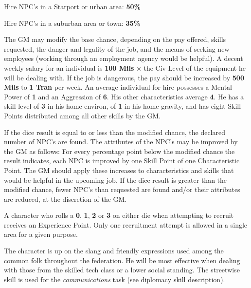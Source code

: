 \begin{tasklist}
\item Hire NPC's in a Starport or urban area: \textbf{50\%}
\item Hire NPC's in a suburban area or town: \textbf{35\%}
\end{tasklist}

The GM may modify the base chance, depending on the pay offered,
skills requested, the danger and legality of the job, and the means of
seeking new employees (working through an employment agency would be
helpful).  A decent weekly salary for an individual is \textbf{100
  Mils} $\times$ the Civ Level of the equipment he will be dealing with.  If
the job is dangerous, the pay should be increased by \textbf{500 Mils}
to \textbf{1 Tran} per week.  An average individual for hire possesses
a Mental Power of \textbf{1} and an Aggression of \textbf{6}.  His
other characteristics average \textbf{4}.  He has a skill level of
\textbf{3} in his home environ, of \textbf{1} in his home gravity, and
has eight Skill Points distributed among all other skills by the GM.

If the dice result is equal to or less than the modified chance, the
declared number of NPC's are found.  The attributes of the NPC's may be
improved by the GM as follows: For every percentage point below the
modified chance the result indicates, each NPC is improved by one
Skill Point of one Characteristic Point.  The GM should apply these
increases to characteristics and skills that would be helpful in the
upcoming job.  If the dice result is greater than the modified chance,
fewer NPC's than requested are found and/or their attributes are
reduced, at the discretion of the GM.

A character who rolls a \textbf{0}, \textbf{1}, \textbf{2} or
\textbf{3} on either die when attempting to recruit receives an
Experience Point.  Only one recruitment attempt is allowed in a single
area for a given purpose.



\label{sec:skill-streetwise}

The character is up on the slang and friendly expressions used among
the common folk throughout the federation.  He will be most effective
when dealing with those from the skilled tech class or a lower social
standing.  The streetwise skill is used for the \emph{communications} task
(see diplomacy skill description).

